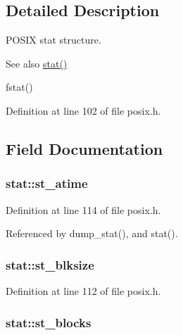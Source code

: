 \subsection{Detailed Description}
P\+O\+S\+IX stat structure. 

\begin{DoxySeeAlso}{See also}
\hyperlink{posix_8c_abef70bf7a4af8a1f4998db0035c51781}{stat()} 

fstat() 
\end{DoxySeeAlso}


Definition at line 102 of file posix.\+h.



\subsection{Field Documentation}
\subsubsection[{\texorpdfstring{st\+\_\+atime}{st_atime}}]{ stat\+::st\+\_\+atime}\hypertarget{structstat_ab74d1e7e345e88b9d0fb2688a97cba64}{}\label{structstat_ab74d1e7e345e88b9d0fb2688a97cba64}


Definition at line 114 of file posix.\+h.



Referenced by dump\+\_\+stat(), and stat().

\subsubsection[{\texorpdfstring{st\+\_\+blksize}{st_blksize}}]{ stat\+::st\+\_\+blksize}\hypertarget{structstat_a38d474e1ae3cf6fbdde89ac3c3e308f1}{}\label{structstat_a38d474e1ae3cf6fbdde89ac3c3e308f1}


Definition at line 112 of file posix.\+h.

\subsubsection[{\texorpdfstring{st\+\_\+blocks}{st_blocks}}]{ stat\+::st\+\_\+blocks}\hypertarget{structstat_a42dd716b2f9234f961d949fc9500eefb}{}\label{structstat_a42dd716b2f9234f961d949fc9500eefb}


